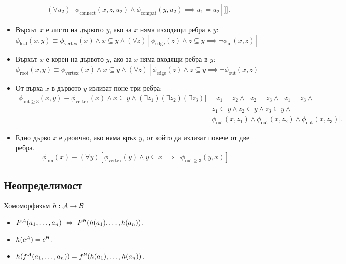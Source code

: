 \begin{problem}
\begin{itemize}
\begin{align*}
                                 & (\forall u_2)[\phi_{\text{connect}}(x,z,u_2) \land \phi_{\text{compat}}(y,u_2) \implies u_1 = u_2]]].
    \end{align*}
  \item
    Върхът $x$ е листо на дървото $y$, ако за $x$ няма изходящи ребра в $y$:
    \[\phi_{\text{leaf}}(x,y) \equiv \phi_{\text{vertex}}(x) \land x \subseteq y \land (\forall z)[\phi_{\text{edge}}(z) \land z \subseteq y \implies \neg \phi_{\text{in}}(x,z)]\]
  \item
    Върхът $x$ е корен на дървото $y$, ако за $x$ няма входящи ребра в $y$:
    \[\phi_{\text{root}}(x,y) \equiv \phi_{\text{vertex}}(x) \land x \subseteq y \land (\forall z)[\phi_{\text{edge}}(z) \land z \subseteq y \implies \neg \phi_{\text{out}}(x,z)]\]
  \item
    От върха $x$ в дървото $y$ излизат поне три ребра:
    \begin{align*}
      \phi_{\text{out}\geq 3}(x,y) \equiv \phi_{\text{vertex}}(x) \land x \subseteq y \land (\exists z_1)(\exists z_2)(\exists z_3)[ & \neg z_1 = z_2 \land \neg z_2 = z_3 \land \neg z_1 = z_3 \land \\
                                                                                                                       & z_1 \subseteq y \land z_2 \subseteq y \land z_3 \subseteq y \land\\
                                                                                                                       & \phi_{\text{out}}(x,z_1) \land \phi_{\text{out}}(x,z_2) \land \phi_{\text{out}}(x,z_3)].
    \end{align*}
  \item
    Едно дърво $x$ е двоично, ако няма връх $y$, от който да излизат повече от две ребра.
    \[\phi_{\text{bin}}(x) \equiv (\forall y)[\phi_{\text{vertex}}(y) \land y \subseteq x \implies \neg \phi_{\text{out}\geq 3}(y,x)]\]
  \end{itemize}
  
\end{problem}
  
\subsection{Неопределимост}

Хомоморфизъм $h : \mathcal{A} \to \mathcal{B}$
\begin{itemize}
\item
  $P^{\mathcal{A}}(a_1,\dots,a_n) \ \Leftrightarrow\  P^{\mathcal{B}}(h(a_1),\dots,h(a_n))$.
\item
  $h(c^{\mathcal{A}}) = c^{\mathcal{B}}$.
\item
  $h(f^{\mathcal{A}}(a_1,\dots,a_n)) = f^{\mathcal{B}}(h(a_1),\dots,h(a_n))$.
\end{itemize}

